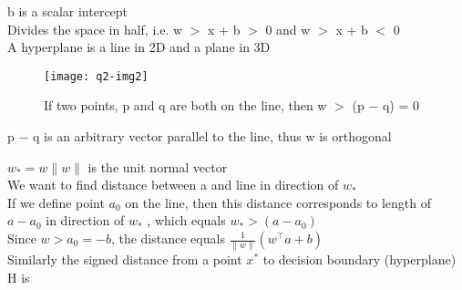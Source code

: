 \documentclass[12pt, a4paper]{article}
\begin{document}
\begin{enumerate}
    b is a scalar intercept \\
    
    Divides the space in half, i.e. w \(>\) x + b \(>\) 0 and w \(>\) x + b \(<\) 0 \\
    
    A hyperplane is a line in 2D and a plane in 3D \\
    
    \begin{figure}[h]
        \centering
        \texttt{[image: q2-img2]}
        \caption{If two points, p and q are both on the line, then w \(>\) (p \(-\) q) = 0}
    \end{figure}

    p  \(-\) q is an arbitrary vector parallel to the line, thus w is orthogonal
    
    \(w_\ast = w \parallel w \parallel \) is the unit normal vector\\
    We want to find distance between a and line in direction of \(w_\ast\) \\
    If we define point \(a_0\) on the line, then this distance corresponds to length of \(a - a_0\)
    in direction of \(w_\ast\) , which equals \(w_\ast > (a - a_0)\)\\
    Since \(w>a_0 = -b\), the distance equals \( \frac{1}{\parallel w \parallel}(w^\top a + b)\)\\
    Similarly the signed distance from a point \(x^*\) to decision boundary (hyperplane) H is\\


\end{enumerate}
\end{document}
